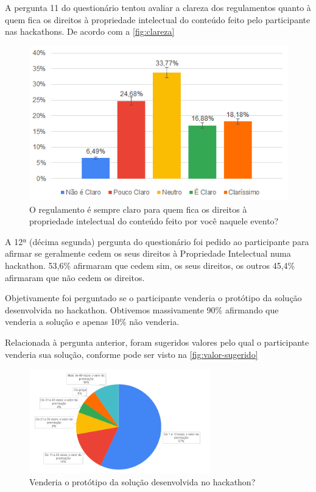 A pergunta 11 do questionário tentou avaliar a clareza dos regulamentos quanto à quem fica os direitos à propriedade intelectual do conteúdo feito pelo participante nas hackathons. De acordo com a \autoref{fig:clareza}

\begin{figure}[H]
    \centering
    \includegraphics{images/clareza.png}
    \caption{O regulamento é sempre claro para quem fica os direitos à propriedade intelectual do conteúdo feito por você naquele evento?}
    \label{fig:clareza}
\end{figure}

A 12ª (décima segunda) pergunta do questionário foi pedido ao participante para afirmar se geralmente cedem os seus direitos à Propriedade Intelectual numa hackathon. 53,6\% afirmaram que cedem sim, os seus direitos, os outros 45,4\% afirmaram que não cedem os direitos.

Objetivamente foi perguntado se o participante venderia o protótipo da solução desenvolvida no hackathon. Obtivemos massivamente 90\% afirmando que venderia a solução e apenas 10\% não venderia.

Relacionada à pergunta anterior, foram sugeridos valores pelo qual o participante venderia sua solução, conforme pode ser visto na \autoref{fig:valor-sugerido}

\begin{figure}[H]
    \centering
    \includegraphics[width=0.7\textwidth]{images/Grafico-valor-venda-solucao.png}
    \caption{Venderia o protótipo da solução desenvolvida no hackathon?}
    \label{fig:valor-sugerido}
\end{figure}


